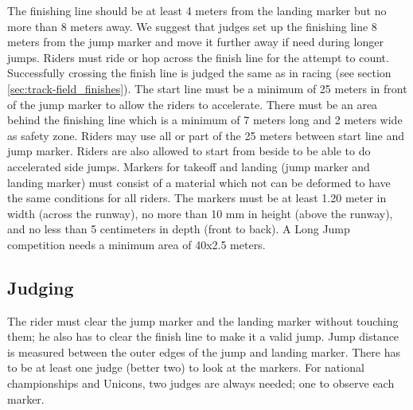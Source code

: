 The finishing line should be at least 4 meters from the landing marker but no more than 8 meters away.
We suggest that judges set up the finishing line 8 meters from the jump marker and move it further away if need during longer jumps.
Riders must ride or hop across the finish line for the attempt to count.
Successfully crossing the finish line is judged the same as in racing (see section \ref{sec:track-field_finishes}).
The start line must be a minimum of 25 meters in front of the jump marker to allow the riders to accelerate.
There must be an area behind the finishing line which is a minimum of 7 meters long and 2 meters wide as safety zone.
Riders may use all or part of the 25 meters between start line and jump marker.
Riders are also allowed to start from beside to be able to do accelerated side jumps.
Markers for takeoff and landing (jump marker and landing marker) must consist of a material which not can be deformed to have the same conditions for all riders.
The markers must be at least 1.20 meter in width (across the runway), no more than 10 mm in height (above the runway), and no less than 5 centimeters in depth (front to back).
A Long Jump competition needs a minimum area of 40x2.5 meters.

\subsection{Judging}
The rider must clear the jump marker and the landing marker without touching them; he also has to clear the finish line to make it a valid jump.
Jump distance is measured between the outer edges of the jump and landing marker.
There has to be at least one judge (better two) to look at the markers.
For national championships and Unicons, two judges are always needed; one to observe each marker.
